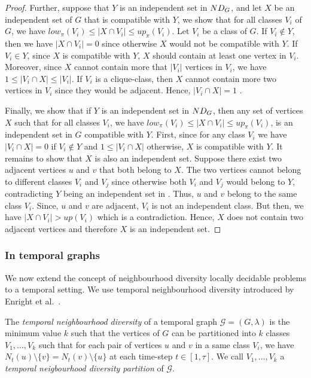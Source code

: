 \begin{proof}
Further, suppose that $Y$ is an independent set in $\ndg[G]$, %
and let $X$ be an independent set of $G$ that is compatible with $Y$, we show that for all classes $V_i$ of $G$, we have $low_\pi(V_i) \leq |X \cap V_i| \leq up_\pi(V_i)$.
  Let $V_i$ be a class of $G$.
  If $V_i\not\in Y$, then we have $|X \cap V_i| = 0$ since otherwise $X$ would not be compatible with $Y$. 
  If $V_i\in Y$, since $X$ is compatible with $Y$, $X$ should contain at least one vertex in $V_i$. Moreover, since $X$ cannot contain more that $|V_i|$ vertices in $V_i$, we have $1 \leq |V_i \cap X| \leq |V_i|$.
  If $V_i$ is a clique-class, then $X$ cannot contain more two vertices in $V_i$ since they would be adjacent.
  Hence, $|V_i \cap X|=1$ .
  
  Finally, we show that if $Y$ is an independent set in $\ndg[G]$, then any set of vertices $X$ such that for all classes $V_i$, we have $low_\pi(V_i) \leq |X \cap V_i| \leq up_\pi(V_i)$, is an independent set in $G$ compatible with $Y$. First, since for any class $V_i$ we have $|V_i \cap X| = 0$ if $V_i \not\in Y$ and $1 \leq |V_i \cap X|$ otherwise, $X$ is compatible with $Y$. It remains to show that $X$ is also an independent set.
  Suppose there exist two adjacent vertices $u$ and $v$ that both belong to $X$. The two vertices cannot belong to different classes $V_i$ and $V_j$ since otherwise both $V_i$ and $V_j$ would belong to $Y$, contradicting $Y$ being an independent set in \ndg[G]. Thus, $u$ and $v$ belong to the same class $V_i$. Since, $u$ and $v$ are adjacent, $V_i$ is not an independent class. But then, we have $|X \cap V_i| > up(V_i)$ which is a contradiction. Hence, $X$ does not contain two adjacent vertices and therefore $X$ is an independent set. 
\end{proof}


\subsubsection{In temporal graphs}
We now extend the concept of neighbourhood diversity locally decidable problems to a temporal setting. We use temporal neighbourhood diversity introduced by Enright et al.~\cite{abs-2404-19453}.


\begin{definition}
The \emph{temporal neighbourhood diversity} of a temporal graph $\mathcal{G}=(G,\lambda)$ is the minimum value $k$ such that the vertices of $G$ can be partitioned into $k$ classes $V_1,\dots,V_k$ such that 
%
  for each pair of vertices $u$ and $v$ in a same class $V_i$, we have $N_t(u) \setminus \{v\} = N_t(v) \setminus \{u\}$ at each time-step $t \in [1,\tau]$.  We call $V_1,\dots,V_k$ a \emph{temporal neigbourhood diversity partition} of $\mathcal{G}$.
\end{definition}

